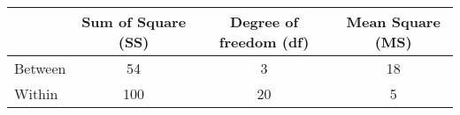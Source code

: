 \begin{tabular}{|l|c|c|c|}
    \hline
     & \textbf{Sum of Square (SS)} & \textbf{Degree of freedom (df)} & \textbf{Mean Square (MS)} \\
    \hline
    Between & 54 & 3 & 18 \\
    Within & 100 & 20 & 5 \\
    \hline
    \end{tabular}

